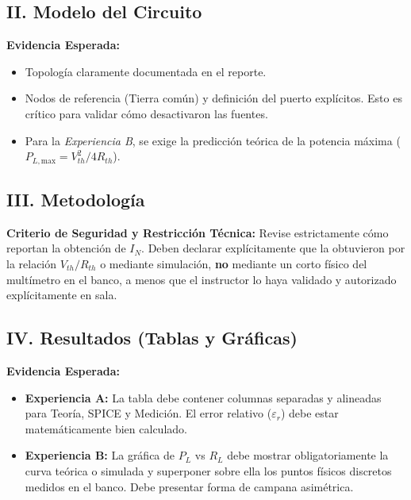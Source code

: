 \documentclass[journal, a4paper]{IEEEtran}
\begin{document}
\subsection{II. Modelo del Circuito}
\textbf{Evidencia Esperada:} 
\begin{itemize}
    \item Topología claramente documentada en el reporte.
    \item Nodos de referencia (Tierra común) y definición del puerto explícitos. Esto es crítico para validar cómo desactivaron las fuentes.
    \item Para la \textit{Experiencia B}, se exige la predicción teórica de la potencia máxima ($P_{L,\text{max}} = V_{th}^2 / 4R_{th}$).
\end{itemize}

\subsection{III. Metodología}
\textbf{Criterio de Seguridad y Restricción Técnica:} Revise estrictamente cómo reportan la obtención de $I_N$. Deben declarar explícitamente que la obtuvieron por la relación $V_{th}/R_{th}$ o mediante simulación, \textbf{no} mediante un corto físico del multímetro en el banco, a menos que el instructor lo haya validado y autorizado explícitamente en sala.

\subsection{IV. Resultados (Tablas y Gráficas)}
\textbf{Evidencia Esperada:}
\begin{itemize}
    \item \textbf{Experiencia A:} La tabla debe contener columnas separadas y alineadas para Teoría, SPICE y Medición. El error relativo ($\varepsilon_r$) debe estar matemáticamente bien calculado.
    \item \textbf{Experiencia B:} La gráfica de $P_L$ vs $R_L$ debe mostrar obligatoriamente la curva teórica o simulada y superponer sobre ella los puntos físicos discretos medidos en el banco. Debe presentar forma de campana asimétrica.
\end{itemize}
\end{document}
